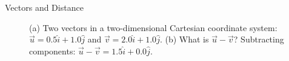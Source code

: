 \documentclass{beamer}
\begin{document}
\begin{frame}{Vectors and Distance}
\begin{figure}
\centering
{}
\caption{\label{fig:twovectors2} (a) Two vectors in a two-dimensional Cartesian coordinate system: $\vec{u} = 0.5\hat{i}+1.0\hat{j}$ and $\vec{v} = 2.0\hat{i}+1.0\hat{j}$.  (b) What is $\vec{u}-\vec{v}$?  Subtracting components: $\vec{u}-\vec{v} = 1.5\hat{i}+0.0\hat{j}$.}
\end{figure}
\end{frame}
\end{document}
